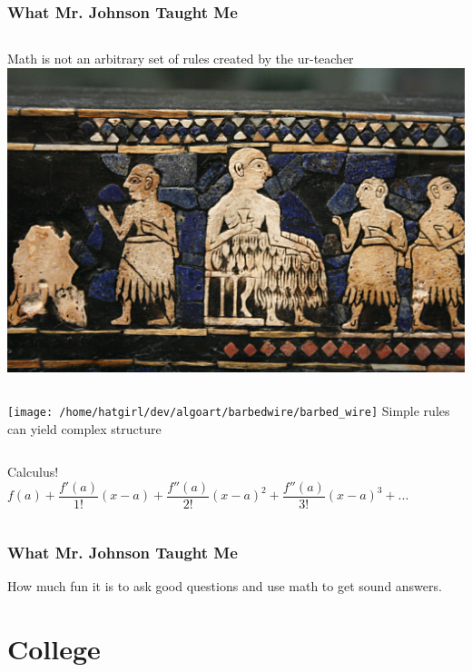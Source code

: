 \documentclass{beamer}
\theoremstyle{mystyle}
\begin{document}
\begin{frame}
\frametitle{What Mr. Johnson Taught Me}

\begin{columns}
		Math is not an arbitrary set of rules created by the ur-teacher\\
		\includegraphics[scale=0.027]{ur.jpg}
\end{columns} 
	\pause
\begin{columns}
		\texttt{[image: /home/hatgirl/dev/algoart/barbedwire/barbed\_wire]}		
		Simple rules can yield complex structure
\end{columns}
	\pause
\begin{columns}
		Calculus!
		\[f(a) + \frac{f'(a)}{1!}(x-a) + \frac{f''(a)}{2!}(x-a)^2 + \frac{f''(a)}{3!}(x-a)^3 + ... \]		
\end{columns}

\end{frame}

\begin{frame}
\frametitle{What Mr. Johnson Taught Me}
\begin{center}
	How much fun it is to ask good questions and use math to get sound answers.
\end{center}
\end{frame}
\section{College}
\frame{\tableofcontents[currentsection]}
\end{document}
